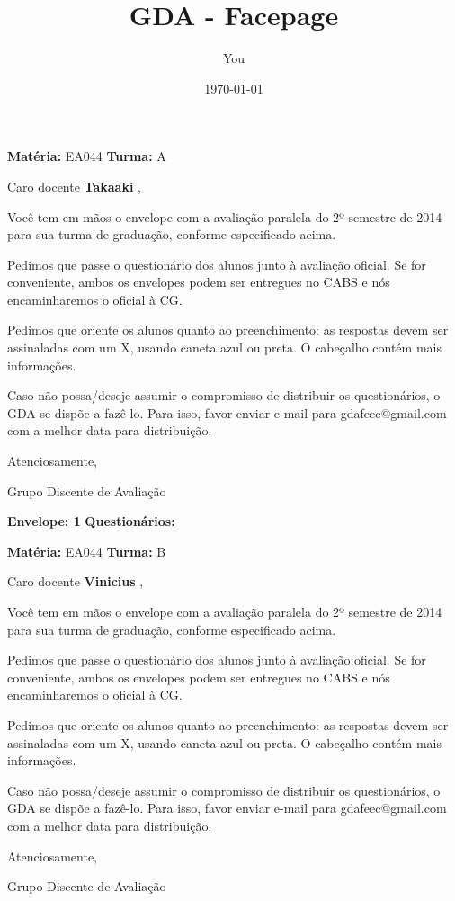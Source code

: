 \documentclass[a5paper]{letter}
\title{GDA - Facepage}
\author{You}
\date{\today}
\begin{document}
\thispagestyle{empty}

\hfill {\bf Matéria:} EA044 {\bf Turma:} A

Caro docente {\bf Takaaki }, 

	Você tem em mãos o envelope com a avaliação paralela do 2º semestre de 2014 para sua turma de graduação, conforme especificado acima.

	Pedimos que passe o questionário dos alunos junto à avaliação oficial. Se for conveniente, ambos os envelopes podem ser entregues no CABS e nós encaminharemos o oficial à CG.

Pedimos que oriente os alunos quanto ao preenchimento: as respostas devem ser assinaladas com um X, usando caneta azul ou preta. O cabeçalho contém mais informações.

	Caso não possa/deseje assumir o compromisso de distribuir os questionários, o GDA se dispõe a fazê-lo. Para isso, favor enviar e-mail para gdafeec@gmail.com com a melhor data para distribuição.


Atenciosamente, 

Grupo Discente de Avaliação

\vspace{0.5cm}

{\bf Envelope: 1 }		\hfill	{\bf Questionários:} \hspace{2cm}

\newpage
\thispagestyle{empty}

\hfill {\bf Matéria:} EA044 {\bf Turma:} B

Caro docente {\bf Vinicius }, 

	Você tem em mãos o envelope com a avaliação paralela do 2º semestre de 2014 para sua turma de graduação, conforme especificado acima.

	Pedimos que passe o questionário dos alunos junto à avaliação oficial. Se for conveniente, ambos os envelopes podem ser entregues no CABS e nós encaminharemos o oficial à CG.

Pedimos que oriente os alunos quanto ao preenchimento: as respostas devem ser assinaladas com um X, usando caneta azul ou preta. O cabeçalho contém mais informações.

	Caso não possa/deseje assumir o compromisso de distribuir os questionários, o GDA se dispõe a fazê-lo. Para isso, favor enviar e-mail para gdafeec@gmail.com com a melhor data para distribuição.


Atenciosamente, 

Grupo Discente de Avaliação
\end{document}
